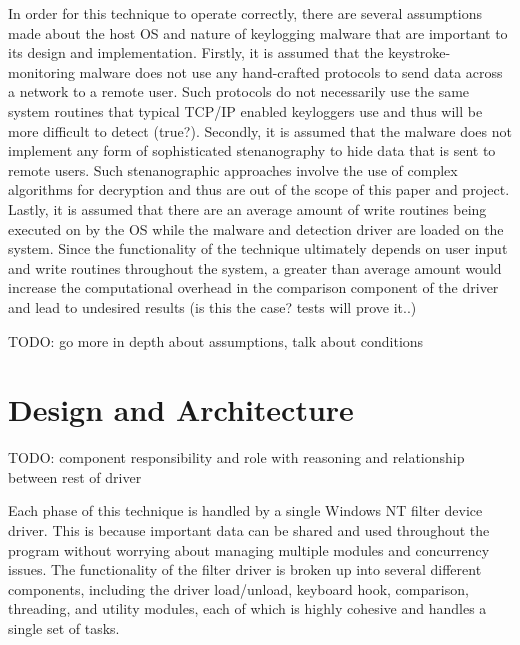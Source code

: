 \documentclass[times, 10pt,twocolumn]{article}
\begin{document}
In order for this technique to operate correctly, there are several assumptions made about the host OS and nature of keylogging malware that are important to its design and implementation. Firstly, it is assumed that the keystroke-monitoring malware does not use any hand-crafted protocols to send data across a network to a remote user. Such protocols do not necessarily use the same system routines that typical TCP/IP enabled keyloggers use and thus will be more difficult to detect (true?). Secondly, it is assumed that the malware does not implement any form of sophisticated stenanography to hide data that is sent to remote users. Such stenanographic approaches involve the use of complex algorithms for decryption and thus are out of the scope of this paper and project. Lastly, it is assumed that there are an average amount of write routines being executed on by the OS while the malware and detection driver are loaded on the system. Since the functionality of the technique ultimately depends on user input and write routines throughout the system, a greater than average amount would increase the computational overhead in the comparison component of the driver and lead to undesired results (is this the case? tests will prove it..)

TODO: go more in depth about assumptions, talk about conditions

\section{Design and Architecture}
\label{Design and Architecture}

TODO: component responsibility and role with reasoning and relationship between rest of driver

Each phase of this technique is handled by a single Windows NT filter device driver. This is because important data can be shared and used throughout the program without worrying about managing multiple modules and concurrency issues. The functionality of the filter driver is broken up into several different components, including the driver load/unload, keyboard hook, comparison, threading, and utility modules, each of which is highly cohesive and handles a single set of tasks. 
\end{document}

